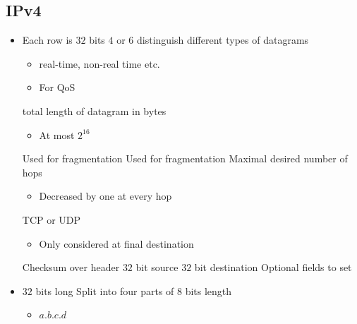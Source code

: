 \subsection{IPv4}
\begin{itemize}
        \begin{itemize}
            \item Each row is $32$ bits
             $4$ or $6$
             distinguish different types of datagrams
                \begin{itemize}
                    \item real-time, non-real time etc.
                    \item For QoS
                \end{itemize}
             total length of datagram in bytes
                \begin{itemize}
                    \item At most $2^{16}$
                \end{itemize}
                 
             Used for fragmentation
             Used for fragmentation
             Maximal desired number of hops
                \begin{itemize}
                    \item Decreased by one at every hop
                \end{itemize}
             TCP or UDP
                \begin{itemize}
                    \item Only considered at final destination
                \end{itemize}
             Checksum over header
             $32$ bit source
             $32$ bit destination
             Optional fields to set
        \end{itemize}
        \begin{itemize}
            \item $32$ bits long
             Split into four parts of $8$ bits length
                \begin{itemize}
                    \item $a.b.c.d$
                \end{itemize}

\end{itemize}
\end{itemize}
